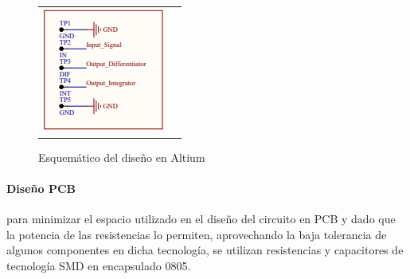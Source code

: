 \begin{figure}[H]
\begin{tabular}{c c}
		\includegraphics[scale=0.7]{../EJ4/Recursos/Altium/Puntos_prueba_esquematico.png}
	\end{tabular}
	\caption{Esquem\'atico del dise\~no en Altium}
	\label{fig:altium_sch}
\end{figure}

\paragraph*{Dise\~no PCB} para minimizar el espacio utilizado en el dise\~no del circuito en PCB y dado que la potencia de las resistencias lo permiten, aprovechando la baja tolerancia de algunos
componentes en dicha tecnolog\'ia, se utilizan resistencias y capacitores de tecnolog\'ia SMD en encapsulado 0805.

